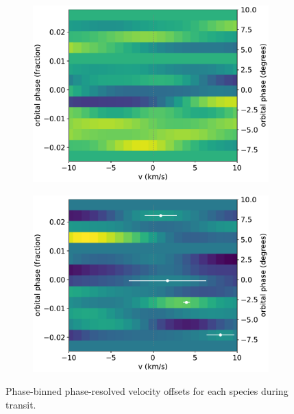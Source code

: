 \documentclass[twocolumn]{aastex631}
\begin{document}
\begin{figure}[ht!]
\begin{subfigure}[b]{0.5\textwidth}
                    \caption{}\label{fig:wind-chars-Fe-combined}
                \end{subfigure}
                 \begin{subfigure}[b]{0.5\textwidth}
                    \includegraphics[width=\textwidth]{plots-updated/line-velocity/binned/pcolor/points/KELT-20b.Ca.phase-binned+RVs.pdf}
                    \caption{}\label{fig:wind-chars-Fe-combined}
                \end{subfigure}
                 \begin{subfigure}[b]{0.5\textwidth}
                    \includegraphics[width=\textwidth]{plots-updated/line-velocity/binned/pcolor/points/KELT-20b.Co.phase-binned+RVs.pdf}
                    \caption{}\label{fig:wind-chars-Fe-combined}
                \end{subfigure}

                \caption{Phase-binned phase-resolved velocity offsets for each species during transit.}
            \end{figure}
    \clearpage
    
{}

        
\end{document}
